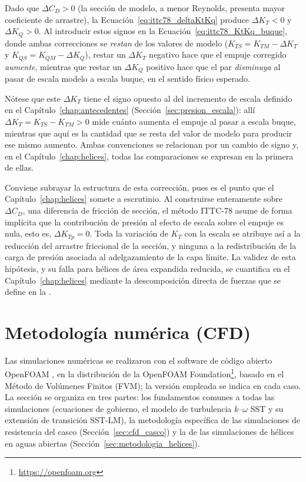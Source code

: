 Dado que $\Delta C_D > 0$ (la sección de modelo, a menor Reynolds, presenta mayor coeficiente de
arrastre), la Ecuación~\eqref{eq:ittc78_deltaKtKq} produce $\Delta K_T < 0$ y
$\Delta K_Q > 0$. Al introducir estos signos en la Ecuación~\eqref{eq:ittc78_KtKq_buque}, donde ambas correcciones se \emph{restan} de los valores de modelo ($K_{TS} = K_{TM} - \Delta K_T$ y $K_{QS} = K_{QM} - \Delta K_Q$), restar un $\Delta K_T$ negativo hace que el empuje corregido \emph{aumente}, mientras que restar un $\Delta K_Q$ positivo hace que el par \emph{disminuya} al pasar de escala modelo a escala buque, en el sentido físico esperado. 

Nótese que este $\Delta K_T$ tiene el signo opuesto al del incremento de escala definido en el Capítulo~\ref{chap:antecedentes} (Sección~\ref{sec:presion_escala}): allí $\Delta K_T = K_{TS} - K_{TM} > 0$ mide cuánto aumenta el empuje al pasar a escala buque, mientras que aquí es la cantidad que se resta del valor de modelo para producir ese mismo aumento. Ambas convenciones se relacionan por un cambio de signo y, en el Capítulo~\ref{chap:helices}, todas las comparaciones se expresan en la primera de ellas.

Conviene subrayar la estructura de esta corrección, pues es el punto que el
Capítulo~\ref{chap:helices} somete a escrutinio. Al construirse enteramente sobre
$\Delta C_D$, una diferencia de fricción de sección, el método ITTC-78 asume de
forma implícita que la contribución de presión al efecto de escala sobre el empuje es
nula, esto es, $\Delta K_{Tp} = 0$. Toda la variación de $K_T$ con la escala se
atribuye así a la reducción del arrastre friccional de la sección, y ninguna a la
redistribución de la carga de presión asociada al adelgazamiento de la capa límite. La
validez de esta hipótesis, y su falla para hélices de área expandida reducida, se
cuantifica en el Capítulo~\ref{chap:helices} mediante la descomposición directa de
fuerzas que se define en la .

\section{Metodología numérica (CFD)}
\label{sec:cfd}

Las simulaciones numéricas se realizaron con el software de código abierto
OpenFOAM \citep{weller1998openfoam}, en la distribución de la OpenFOAM
Foundation\footnote{\url{https://openfoam.org}}, basado en el Método de
Volúmenes Finitos (FVM); la versión empleada se indica en cada caso. La sección se organiza en tres partes: los fundamentos comunes a todas las simulaciones (ecuaciones de gobierno, el modelo de turbulencia $k$--$\omega$ SST y su extensión de transición SST-LM), la metodología específica de las simulaciones de resistencia del casco (Sección~\ref{sec:cfd_casco}) y la de las simulaciones de hélices en aguas abiertas (Sección~\ref{sec:metodologia_helices}).

